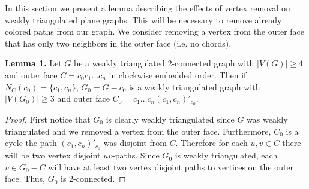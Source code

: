 \documentclass[12pt,a4paper]{article}
\begin{document}
In this section we present a lemma describing the effects of vertex removal on weakly triangulated plane
graphs. This will be necessary to remove already colored paths from our graph. We consider removing a vertex
from the outer face that has only two neighbors in the outer face (i.e. no chords).\\

\begin{adjustwidth}{2em}{2em}
\noindent \textbf{Lemma 1.} Let $G$ be a weakly triangulated $2$-connected graph with $|V(G)|\ge 4$ and
outer face
$C=c_0c_1\ldots c_{n}$ in clockwise embedded order. Then if $N_C(c_0)=\{c_{1},c_{n}\}$,
$G_0=G-c_0$ is a weakly triangulated graph with $|V(G_0)|\ge 3$ and outer face
$C_0=c_1\ldots c_{n}(c_{1},c_{n})'_{c_0}$.\\
\end{adjustwidth}

\begin{proof}
First notice that $G_0$ is clearly weakly triangulated since $G$ was weakly triangulated and we removed a
vertex from the outer face. Furthermore, $C_0$ is a cycle the path $(c_1,c_n)'_{c_0}$ was disjoint from $C$.
Therefore for each $u,v\in C$ there will be two vertex disjoint $uv$-paths. Since $G_0$
is weakly triangulated, each $v\in G_0-C$ will have at least two vertex disjoint
paths to vertices on the outer face. Thus, $G_0$ is $2$-connected.
\begin{comment}A disjoint $uv$-path will be a $uv$-path
that is vertex disjoint except for the vertices $u$ and $v$.
Let $u,v\in G_0$. If $u,v\in C_0$ then there are clearly two disjoint $uv$-paths. If $u\in C_0$ and
$v\not\in C_0$, there are two edge disjoint paths $v$ to $C_0$, and thus two disjoint $uv$-paths. Finally,
if $u,v\not\in C_0$ then we may find two disjoint paths from $u$ to $C_0$ and two disjoint paths $v$ to $C_0$
and join each pair using the outer cycle.
Clearly in each case we have two edge disjoint $uv$-paths and $G_0$ is $2$-connected.\end{comment}
\end{proof}
\hfill\\
\end{document}
